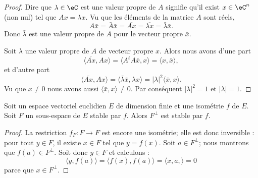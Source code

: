 \begin{proof}
    Dire que \( \lambda\in \eC\) est une valeur propre de \( A\) signifie qu'il exist \( x\in \eC^n\) (non nul) tel que \( Ax=\lambda x\). Vu que les éléments de la matrice \( A\) sont réels,
    \begin{equation}
        A\bar x=\bar A\bar x=\overline{ Ax }=\overline{ \lambda x }=\bar \lambda\bar x.
    \end{equation}
    Donc \( \bar \lambda\) est une valeur propre de \( A\) pour le vecteur propre \( \bar x\).

    Soit \( \lambda\)  une valeur propre de \( A\) de vecteur propre \( x\). Alors nous avons d'une part
    \begin{equation}
        \langle \overline{ Ax }, Ax\rangle =\langle A^tA\bar x, x\rangle =\langle x, \bar x\rangle ,
    \end{equation}
    et d'autre part
    \begin{equation}
        \langle \overline{ Ax }, Ax\rangle =\langle \bar \lambda \bar x, \lambda x\rangle =| \lambda |^2\langle \bar x, x\rangle .
    \end{equation}
    Vu que \( x\neq 0\) nous avons aussi \( \langle \bar x, x\rangle \neq 0\). Par conséquent \( | \lambda |^2=1\) et \( | \lambda |=1\).
\end{proof}

\begin{lemma}        \label{LEMooNEDQooNRmASH}
    Soit un espace vectoriel euclidien \( E\) de dimension finie et une isométrie \( f\) de \( E\). Soit \( F\) un sous-espace de \( E\) stable par \( f\). Alors \( F^{\perp}\) est stable par \( f\).
\end{lemma}

\begin{proof}
    La restriction \( f_F\colon F\to F\) est encore une isométrie; elle est donc inversible : pour tout $y\in F$, il existe \( x\in F\) tel que \( y=f(x)\). Soit \( a\in F^{\perp}\); nous montrons que \( f(a)\in F^{\perp}\). Soit donc \( y\in F\) et calculons :
    \begin{equation}
        \langle y, f(a)\rangle =\langle f(x), f(a)\rangle =\langle x,a, \rangle =0
    \end{equation}
    parce que \( x\in F^{\perp}\).
\end{proof}

